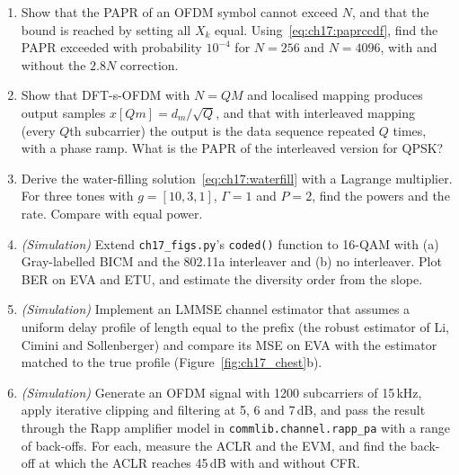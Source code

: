 \begin{enumerate}[label=\thechapter.\arabic*]
690\,MHz for a Doppler SIR of 20\,dB?
\item Show that the PAPR of an OFDM symbol cannot exceed $N$, and that the bound is reached by setting all $X_k$ equal.
Using~\eqref{eq:ch17:paprccdf}, find the PAPR exceeded with probability $10^{-4}$ for $N=256$ and $N=4096$, with and
without the $2.8N$ correction.
\item Show that DFT-s-OFDM with $N=QM$ and localised mapping produces output samples $x[Qm]=d_m/\sqrt Q$, and that with
interleaved mapping (every $Q$th subcarrier) the output is the data sequence repeated $Q$ times, with a phase ramp.
What is the PAPR of the interleaved version for QPSK?
\item Derive the water-filling solution~\eqref{eq:ch17:waterfill} with a Lagrange multiplier. For three tones with
$g=[10,3,1]$, $\Gamma=1$ and $P=2$, find the powers and the rate. Compare with equal power.
\item \emph{(Simulation)} Extend \texttt{ch17\_figs.py}'s \texttt{coded()} function to 16-QAM with (a) Gray-labelled
BICM and the 802.11a interleaver and (b) no interleaver. Plot BER on EVA and ETU, and estimate the diversity order from
the slope.
\item \emph{(Simulation)} Implement an LMMSE channel estimator that assumes a uniform delay profile of length equal to the
prefix (the robust estimator of Li, Cimini and Sollenberger) and compare its MSE on EVA with the estimator matched to
the true profile (Figure~\ref{fig:ch17_chest}b).
\item \emph{(Simulation)} Generate an OFDM signal with 1200 subcarriers of 15\,kHz, apply iterative clipping and filtering
at 5, 6 and 7\,dB, and pass the result through the Rapp amplifier model in \texttt{commlib.channel.rapp\_pa} with a range of
back-offs. For each, measure the ACLR and the EVM, and find the back-off at which the ACLR reaches 45\,dB with and
without CFR.
\end{enumerate}

